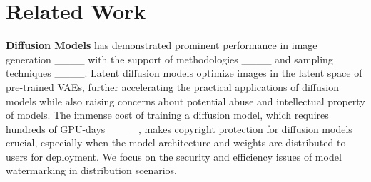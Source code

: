 \section{Related Work}


\textbf{Diffusion Models} has demonstrated prominent performance in image generation ____ with the support of methodologies ____ and sampling techniques ____.
Latent diffusion models optimize images in the latent space of pre-trained VAEs, further accelerating the practical applications of diffusion models while also raising concerns about potential abuse and intellectual property of models. 
The immense cost of training a diffusion model, which requires hundreds of GPU-days ____, makes copyright protection for diffusion models crucial, especially when the model architecture and weights are distributed to users for deployment. We focus on the security and efficiency issues of model watermarking in distribution scenarios.


